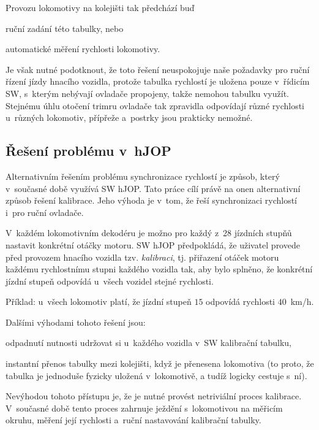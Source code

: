 Provozu lokomotivy na kolejišti tak předchází buď

\begin{compactitem}
	\item ruční zadání této tabulky, nebo
	\item automatické měření rychlosti lokomotivy.
\end{compactitem}

Je však nutné podotknout, že toto řešení neuspokojuje naše požadavky pro
ruční řízení jízdy hnacího vozidla, protože tabulka rychlostí je uložena
pouze v~řídicím SW, s~kterým nebývají ovladače propojeny, takže nemohou tabulku
využít. Stejnému úhlu otočení trimru ovladače tak zpravidla odpovídají různé
rychlosti u~různých lokomotiv, přípřeže a~postrky jsou prakticky nemožné.

\subsection{Řešení problému v~hJOP}

Alternativním řešením problému synchronizace rychlostí je způsob, který
v~současné době využívá SW hJOP. Tato práce cílí právě na onen alternativní
způsob řešení kalibrace. Jeho výhoda je v~tom, že řeší synchronizaci
rychlostí i~pro ruční ovladače.

V~každém lokomotivním dekodéru je možno pro každý z~28 jízdních stupňů nastavit
konkrétní otáčky motoru. SW hJOP předpokládá, že uživatel provede před
provozem hnacího vozidla tzv. \textit{kalibraci}, tj. přiřazení otáček motoru
každému rychlostnímu stupni každého vozidla tak, aby bylo splněno, že konkrétní
jízdní stupeň odpovídá u~všech vozidel stejné rychlosti.

Příklad: u~všech lokomotiv platí, že jízdní stupeň $15$ odpovídá rychlosti
$40$~km/h.

Dalšími výhodami tohoto řešení jsou:

\begin{compactenum}
	\item odpadnutí nutnosti udržovat si u~každého vozidla v~SW kalibrační
	tabulku,
	\item instantní přenos tabulky mezi kolejišti, když je přenesena
	lokomotiva (to proto, že tabulka je jednoduše fyzicky uložená v~lokomotivě,
	a tudíž logicky cestuje s~ní).
\end{compactenum}

Nevýhodou tohoto přístupu je, že je nutné provést netriviální proces kalibrace.
V~současné době tento proces zahrnuje ježdění s~lokomotivou na měřicím okruhu,
měření její rychlosti a~ruční nastavování kalibrační tabulky.

